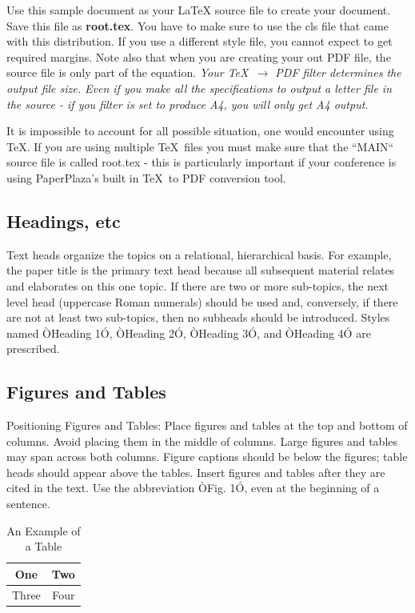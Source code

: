 \documentclass[letterpaper, 10 pt, conference]{ieeeconf}  %
\begin{document}
Use this sample document as your LaTeX source file to create your document. Save this file as {\bf root.tex}. You have to make sure to use the cls file that came with this distribution. If you use a different style file, you cannot expect to get required margins. Note also that when you are creating your out PDF file, the source file is only part of the equation. {\it Your \TeX\ $\rightarrow$ PDF filter determines the output file size. Even if you make all the specifications to output a letter file in the source - if you filter is set to produce A4, you will only get A4 output. }

It is impossible to account for all possible situation, one would encounter using \TeX. If you are using multiple \TeX\ files you must make sure that the ``MAIN`` source file is called root.tex - this is particularly important if your conference is using PaperPlaza's built in \TeX\ to PDF conversion tool.

\subsection{Headings, etc}

Text heads organize the topics on a relational, hierarchical basis. For example, the paper title is the primary text head because all subsequent material relates and elaborates on this one topic. If there are two or more sub-topics, the next level head (uppercase Roman numerals) should be used and, conversely, if there are not at least two sub-topics, then no subheads should be introduced. Styles named ÒHeading 1Ó, ÒHeading 2Ó, ÒHeading 3Ó, and ÒHeading 4Ó are prescribed.

\subsection{Figures and Tables}

Positioning Figures and Tables: Place figures and tables at the top and bottom of columns. Avoid placing them in the middle of columns. Large figures and tables may span across both columns. Figure captions should be below the figures; table heads should appear above the tables. Insert figures and tables after they are cited in the text. Use the abbreviation ÒFig. 1Ó, even at the beginning of a sentence.

\begin{table}[h]
\caption{An Example of a Table}
\label{table_example}
\begin{center}
\begin{tabular}{|c||c|}
\hline
One & Two\\
\hline
Three & Four\\
\hline
\end{tabular}
\end{center}
\end{table}
\end{document}
